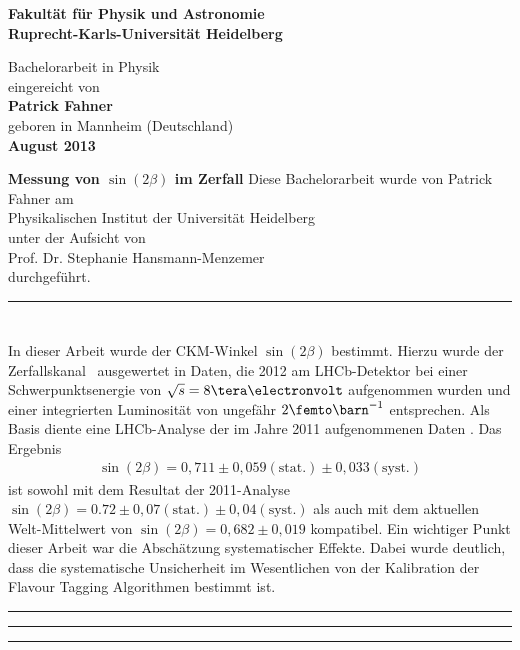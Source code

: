 \begin{titlepage}
\thispagestyle{empty}
\begin{center}
 
\Large\textbf{Fakultät für Physik und Astronomie\\
Ruprecht-Karls-Universität Heidelberg}

\vfill
\normalsize
Bachelorarbeit in Physik\\
eingereicht von\\
\vspace{0.5cm}
\Large\textbf{Patrick Fahner}\\
\normalsize
\vspace{0.5cm}
geboren in Mannheim (Deutschland)\\
\vspace{0.5cm}
\Large\textbf{August 2013}

\newpage
\thispagestyle{empty}
\cleardoublepage

\normalsize
\boldmath
\Huge{\textbf{Messung von $\sin(2\beta)$ im Zerfall \Decaychannel}}
\unboldmath
\vfill
\normalsize
Diese Bachelorarbeit wurde von Patrick Fahner am\\
Physikalischen Institut der Universität Heidelberg\\
unter der Aufsicht von\\
Prof. Dr. Stephanie Hansmann-Menzemer \\
durchgeführt.
\end{center}
\end{titlepage}
\newpage
\hrule
\section*{\abstractname}
In dieser Arbeit wurde der CKM-Winkel $\sin(2\beta)$ bestimmt. Hierzu wurde der Zerfallskanal \Decaychannel\ ausgewertet in Daten, die 2012 am LHCb-Detektor bei einer Schwerpunktsenergie von $\sqrt{s}=8\tera\electronvolt$ aufgenommen wurden und einer integrierten Luminosität von ungefähr $2\femto\barn^{-1}$ entsprechen. Als Basis diente eine LHCb-Analyse der im Jahre 2011 aufgenommenen Daten \cite{lhcb-paper}. Das Ergebnis 
\begin{align*}
\sin(2\beta) = 0,711 \pm 0,059(\text{stat.}) \pm 0,033(\text{syst.})
\end{align*}
ist sowohl mit dem Resultat der 2011-Analyse $\sin(2\beta) = 0.72 \pm 0,07 (\text{stat.}) \pm 0,04 (\text{syst.})$ \cite{lhcb-paper} als auch mit dem aktuellen Welt-Mittelwert von $\sin(2\beta) = 0,682 \pm 0,019$ \cite{pdg-average} kompatibel. Ein wichtiger Punkt dieser Arbeit war die Abschätzung systematischer Effekte. Dabei wurde deutlich, dass die systematische Unsicherheit im Wesentlichen von der Kalibration der Flavour Tagging Algorithmen bestimmt ist. \\
\hrule
\vfill
\hrule
{}
\hrule
